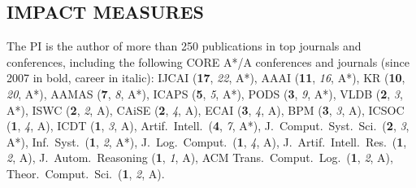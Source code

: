 
\vspace{-3ex}
\subsection*{IMPACT MEASURES}
\vspace{-3ex}
The PI is the author of more than 250 publications in top journals and conferences, including the following CORE A*/A conferences and journals (since 2007 in bold, career in italic):
IJCAI (\textbf{17}, \textit{22}, A*), 
AAAI (\textbf{11}, \textit{16}, A*), 
KR (\textbf{10}, \textit{20}, A*), 
AAMAS (\textbf{7}, \textit{8}, A*), 
ICAPS (\textbf{5}, \textit{5}, A*), 
PODS (\textbf{3}, \textit{9}, A*), 
VLDB (\textbf{2}, \textit{3}, A*),
ISWC  (\textbf{2}, \textit{2}, A),
CAiSE (\textbf{2}, \textit{4}, A), 
ECAI (\textbf{3}, \textit{4}, A),
BPM (\textbf{3}, \textit{3}, A),
ICSOC (\textbf{1}, \textit{4}, A),  
ICDT (\textbf{1}, \textit{3}, A), 
Artif.\ Intell.\ (\textbf{4}, \textit{7}, A*),
J.\ Comput.\ Syst.\ Sci.\ (\textbf{2}, \textit{3}, A*), 
Inf.\ Syst.\ (\textbf{1}, \textit{2}, A*),
J.\ Log.\ Comput.\ (\textbf{1}, \textit{4}, A),
J.\ Artif.\ Intell.\ Res.\ (\textbf{1}, \textit{2}, A),
J.\ Autom.\ Reasoning (\textbf{1}, \textit{1}, A),
ACM Trans.\ Comput.\ Log.\ (\textbf{1}, \textit{2}, A),
Theor.\ Comput.\ Sci.\ (\textbf{1}, \textit{2}, A).


